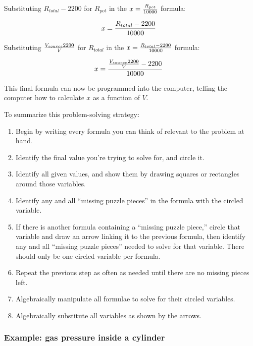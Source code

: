 \vskip 10pt

Substituting $R_{total} - 2200$ for $R_{pot}$ in the $x = {R_{pot} \over 10000}$ formula:

$$x = {{R_{total} - 2200} \over 10000}$$

\vskip 10pt

Substituting $V_{source} 2200 \over V$ for $R_{total}$ in the $x = {R_{total} - 2200 \over 10000}$ formula:

$$x = {{{V_{source} 2200 \over V} - 2200} \over 10000}$$

This final formula can now be programmed into the computer, telling the computer how to calculate $x$ as a function of $V$.

\vskip 10pt

\filbreak

To summarize this problem-solving strategy:

\begin{enumerate}
\item Begin by writing every formula you can think of relevant to the problem at hand.
\item Identify the final value you're trying to solve for, and circle it.
\item Identify all given values, and show them by drawing squares or rectangles around those variables.
\item Identify any and all ``missing puzzle pieces'' in the formula with the circled variable.
\item If there is another formula containing a ``missing puzzle piece,'' circle that variable and draw an arrow linking it to the previous formula, then identify any and all ``missing puzzle pieces'' needed to solve for that variable.  There should only be one circled variable per formula.
\item Repeat the previous step as often as needed until there are no missing pieces left.
\item Algebraically manipulate all formulae to solve for their circled variables.
\item Algebraically substitute all variables as shown by the arrows.
\end{enumerate}







\vskip 10pt

\filbreak
\subsubsection{Example: gas pressure inside a cylinder}

